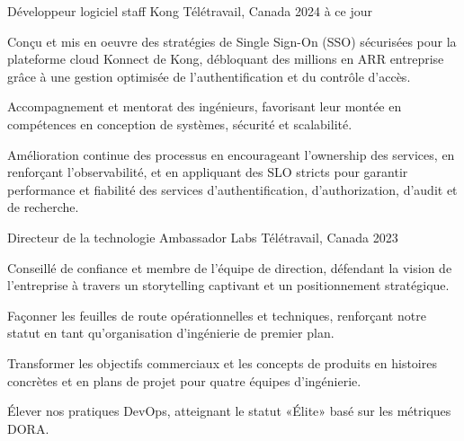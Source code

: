 
\begin{cventries}

  \cventry
    {Développeur logiciel staff} %
    {Kong} %
    {Télétravail, Canada} %
    {2024 à ce jour} %
    {
      \begin{cvitems} %
        \item {Conçu et mis en oeuvre des stratégies de Single Sign-On (SSO) sécurisées pour la plateforme cloud Konnect de Kong, débloquant des millions en ARR entreprise grâce à une gestion optimisée de l’authentification et du contrôle d’accès.}
        \item {Accompagnement et mentorat des ingénieurs, favorisant leur montée en compétences en conception de systèmes, sécurité et scalabilité.}
        \item {Amélioration continue des processus en encourageant l’ownership des services, en renforçant l’observabilité, et en appliquant des SLO stricts pour garantir performance et fiabilité des services d'authentification, d'authorization, d'audit et de recherche.}
      \end{cvitems}
    }

  \cventry
    {Directeur de la technologie} %
    {Ambassador Labs} %
    {Télétravail, Canada} %
    {2023} %
    {
      \begin{cvitems} %
        \item {Conseillé de confiance et membre de l'équipe de direction, défendant la vision de l'entreprise à travers un storytelling captivant et un positionnement stratégique.}
        \item {Façonner les feuilles de route opérationnelles et techniques, renforçant notre statut en tant qu'organisation d'ingénierie de premier plan.}
        \item {Transformer les objectifs commerciaux et les concepts de produits en histoires concrètes et en plans de projet pour quatre équipes d'ingénierie.}
        \item {Élever nos pratiques DevOps, atteignant le statut «Élite» basé sur les métriques DORA.}
      \end{cvitems}
    }


\end{cventries}
